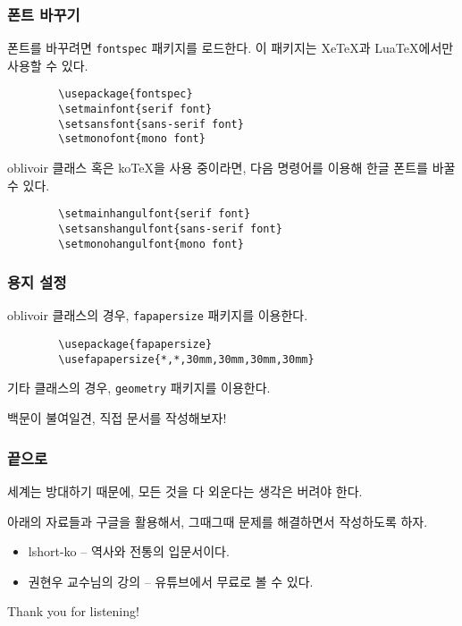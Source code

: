 \begin{frame}[fragile]
    \frametitle{폰트 바꾸기}

    폰트를 바꾸려면 \texttt{fontspec} 패키지를 로드한다. 이 패키지는 XeTeX과 LuaTeX에서만 사용할 수 있다.

    \begin{verbatim}
        \usepackage{fontspec}
        \setmainfont{serif font}
        \setsansfont{sans-serif font}
        \setmonofont{mono font}
    \end{verbatim}

    oblivoir 클래스 혹은 koTeX을 사용 중이라면, 다음 명령어를 이용해 한글 폰트를 바꿀 수 있다.

    \begin{verbatim}
        \setmainhangulfont{serif font}
        \setsanshangulfont{sans-serif font}
        \setmonohangulfont{mono font}
    \end{verbatim}

\end{frame}

\begin{frame}[fragile]
    \frametitle{용지 설정}

    oblivoir 클래스의 경우, \texttt{fapapersize} 패키지를 이용한다.

    \begin{verbatim}
        \usepackage{fapapersize}
        \usefapapersize{*,*,30mm,30mm,30mm,30mm}
    \end{verbatim}

    기타 클래스의 경우, \texttt{geometry} 패키지를 이용한다.
\end{frame}

\begin{frame}[c]

    \begin{center}
        백문이 불여일견, 직접 문서를 작성해보자!
    \end{center}

\end{frame}

\begin{frame}
    \frametitle{끝으로}

     세계는 방대하기 때문에, 모든 것을 다 외운다는 생각은 버려야 한다.

    아래의 자료들과 구글을 활용해서, 그때그때 문제를 해결하면서 작성하도록 하자.

    \begin{itemize}
        \item lshort-ko -- 역사와 전통의 \latex 입문서이다.
        \item 권현우 교수님의 강의 -- 유튜브에서 무료로 볼 수 있다.
    \end{itemize}

\end{frame}

\begin{frame}[c]

    \begin{center}
        {\Huge Thank you for listening!}
    \end{center}

\end{frame}


